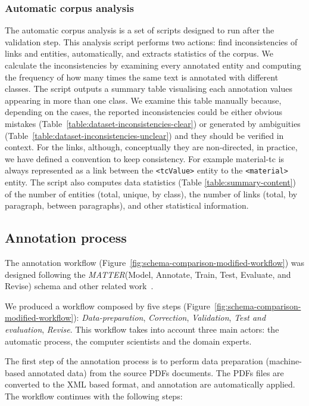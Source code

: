 \documentclass[fleqn,10pt]{wlscirep}
\begin{document}
\subsubsection*{Automatic corpus analysis}
The automatic corpus analysis is a set of scripts designed to run after the validation step. 
This analysis script performs two actions: find inconsistencies of links and entities, automatically, and extracts statistics of the corpus. 
We calculate the inconsistencies by examining every annotated entity and computing the frequency of how many times the same text is annotated with different classes. 
The script outputs a summary table visualising each annotation values appearing in more than one class.
We examine this table manually because, depending on the cases, the reported inconsistencies could be either obvious mistakes (Table~\ref{table:dataset-inconsistencies-clear}) or generated by ambiguities (Table~\ref{table:dataset-inconsistencies-unclear}) and they should be verified in context. 
For the links, although, conceptually they are non-directed, in practice, we have defined a convention to keep consistency. For example material-tc is always represented as a link between the \texttt{<tcValue>} entity to the \texttt{<material>} entity. 
The script also computes data statistics (Table \ref{table:summary-content}) of the number of entities (total, unique, by class), the number of links (total, by paragraph, between paragraphs), and other statistical information. 

\FloatBarrier
\subsection*{Annotation process}
\label{subsec:annotation-workflow}
The annotation workflow (Figure~\ref{fig:schema-comparison-modified-workflow}) was designed following the \textit{MATTER}(Model, Annotate, Train, Test, Evaluate, and Revise) schema\cite{pustejovsky2012natural}  and other related work~\cite{Dieb2016, Krallinger2015TheCC}.

We produced a workflow composed by five steps (Figure~\ref{fig:schema-comparison-modified-workflow}): \textit{Data-preparation}, \textit{Correction}, \textit{Validation}, \textit{Test and evaluation}, \textit{Revise}. 
This workflow takes into account three main actors: the automatic process, the computer scientists and the domain experts.

The first step of the annotation process is to perform data preparation (machine-based annotated data) from the source PDFs documents. 
The PDFs files are converted to the XML based format, and annotation are automatically applied. 
The workflow continues with the following steps: 
\end{document}
